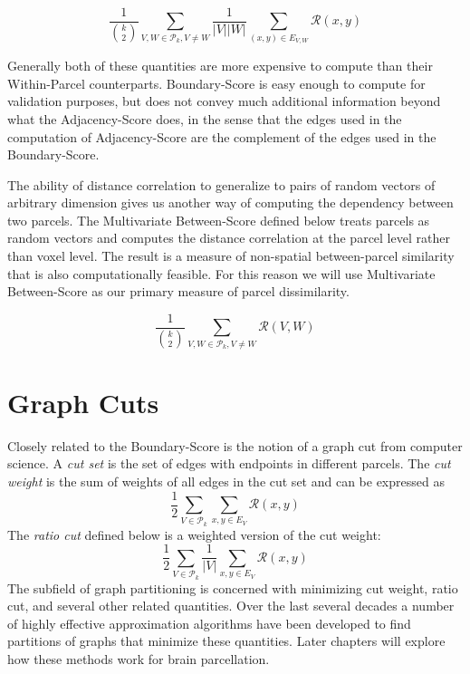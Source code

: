 \begin{definition} \label{boundary-score}
\[ \frac{1}{\binom{k}{2}} \sum_{V, W \in \mathcal{P}_k, V \neq W}
   \frac{1}{|V||W|} \sum_{(x,y) \in E_{V,W}} \mathcal{R}(x,y)
\]
\end{definition}

Generally both of these quantities are more expensive to compute than
their Within-Parcel counterparts. Boundary-Score is easy enough to
compute for validation purposes, but does not convey much additional
information beyond what the Adjacency-Score does, in the sense that
the edges used in the computation of Adjacency-Score are the complement
of the edges used in the Boundary-Score.

The ability of distance correlation to generalize to pairs of random
vectors of arbitrary dimension gives us another way of computing
the dependency between two parcels. The Multivariate Between-Score
defined below treats parcels as random vectors and computes the distance
correlation at the parcel level rather than voxel level. The result is
a measure of non-spatial between-parcel similarity that is also
computationally feasible. For this reason we will use Multivariate
Between-Score as our primary measure of parcel dissimilarity.

\begin{definition}
\label{multi-between-score}
\[ \frac{1}{\binom{k}{2}} \sum_{V, W \in \mathcal{P}_k, V \neq W}
   \mathcal{R}(V, W)
\]
\end{definition}


\section{Graph Cuts}

Closely related to the Boundary-Score is the notion of a graph cut from
computer science. A \textit{cut set} is the set of edges with endpoints
in different parcels. The \textit{cut weight} is the sum of weights of
all edges in the cut set and can be expressed as
\[ \frac{1}{2} \sum_{V \in \mathcal{P}_k}
   \sum_{x,y \in E_V} \mathcal{R}(x,y) \]
The \textit{ratio cut} defined below is a weighted version of the cut
weight:
\[ \frac{1}{2} \sum_{V \in \mathcal{P}_k} \frac{1}{|V|}
   \sum_{x,y \in E_V} \mathcal{R}(x,y)
\]
The subfield of graph partitioning is concerned with minimizing
cut weight, ratio cut, and several other related quantities. Over the
last several decades a number of highly effective approximation
algorithms have been developed to find partitions of graphs that
minimize these quantities. Later chapters will explore how these methods
work for brain parcellation.

